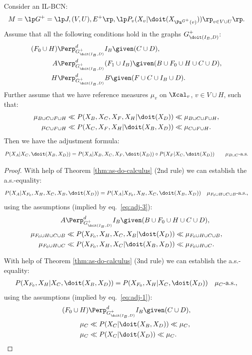 \begin{Thm}
    \label{thm-gen-adjustment}
Consider an IL-BCN:
        \[M= \lp G^+=\lp J,(V,U),E^+ \rp, \lp P_v ( X_v|\doit( X_{\Pa^{G^+}(v)})) \rp_{v \in V \cup U} \rp.\]
    Assume that all the following conditions hold in the graphs $G^+_{\doit(I_B,D)}$: 
    \begin{align}
        (F_0 \cup H) & \Perp^d_{G^+_{\doit(I_B,D)}} I_B \given (C \cup D), \label{eq:adj-1} \\
        A & \Perp^d_{G^+_{\doit(I_B,D)}} (F_1 \cup I_B) \given (B \cup F_0 \cup H \cup C \cup D),\label{eq:adj-3} \\
       H &\Perp^d_{G^+_{\doit(I_B,D)}} B \given (F \cup C \cup  I_B \cup D). \label{eq:adj-5} 
   \end{align}
   Further assume that we have reference measures $\mu_v$ on $\Xcal_v$, $v \in V \cup H$, such that:
  \begin{align*}
      \mu_{B \cup C \cup F \cup H} &\ll  P(X_B,X_C,X_F,X_H|\doit(X_D)) \ll \mu_{B \cup C \cup F \cup H},\\
      \mu_{C \cup F \cup H} &\ll  P(X_C,X_F,X_H|\doit(X_B,X_D)) \ll \mu_{C \cup F \cup H}.
  \end{align*}
    Then we have the adjustment formula: 
    \[ P(X_A|X_C,\doit(X_B,X_D)) = P(X_A|X_B,X_C,X_F,\doit(X_D)) \circ P(X_F|X_C,\doit(X_D)) \qquad  \mu_{B \cup C}\text{-a.s.} \]
\begin{proof}
With help of Theorem \ref{thm:as-do-calculus} (2nd rule) we can establish the a.s.-equality:
    \begin{align}
        P(X_A|X_{F_0},X_H,X_C,X_B,\doit(X_D)) &= P(X_A|X_{F_0},X_H,X_C,\doit(X_B,X_D)) &\mu_{F_0 \cup H \cup C \cup B} \text{-a.s.,} \label{eq:adj-eq-6}
    \end{align}
    using the assumptions (implied by eq.\ \ref{eq:adj-3}):
\begin{align*}
    A & \Perp^d_{G^+_{\doit(I_B,D)}} I_B \given (B \cup F_0 \cup H \cup C \cup D),\\
\mu_{F_0 \cup H \cup C \cup B} & \ll P(X_{F_0},X_H,X_C,X_B|\doit(X_D)) \ll \mu_{F_0 \cup H \cup C \cup B},\\
\mu_{F_0 \cup H \cup C} & \ll P(X_{F_0},X_H,X_C|\doit(X_B,X_D)) \ll \mu_{F_0 \cup H \cup C}.
\end{align*}

With help of Theorem \ref{thm:as-do-calculus} (3nd rule) we can establish the a.s.-equality:
    \begin{align}
        P(X_{F_0},X_H|X_C,\doit(X_B,X_D)) &= P(X_{F_0},X_H|X_C,\doit(X_D)) 
         &\mu_C\text{-a.s.,} \label{eq:adj-eq-7}
    \end{align}
    using the assumptions (implied by eq.\ \ref{eq:adj-1}):
\begin{align*}
    (F_0 \cup H) & \Perp^d_{G^+_{\doit(I_B,D)}} I_B \given (C \cup D),\\
    \mu_C & \ll P(X_C|\doit(X_B,X_D)) \ll \mu_C,\\
    \mu_C & \ll P(X_C|\doit(X_D)) \ll \mu_C.
\end{align*}


\end{proof}
\end{Thm}
